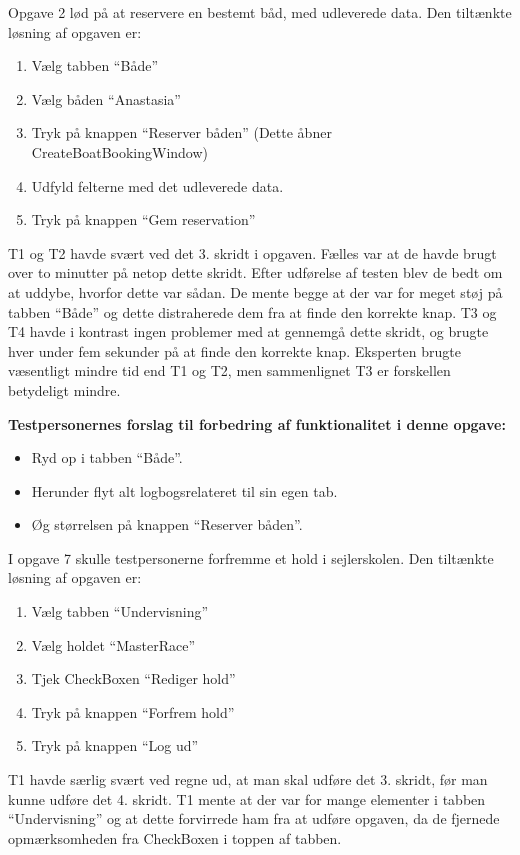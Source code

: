 Opgave 2 lød på at reservere en bestemt båd, med udleverede data.
Den tiltænkte løsning af opgaven er:
\begin{enumerate}
    \item Vælg tabben ``Både''
    \item Vælg båden ``Anastasia''
    \item Tryk på knappen ``Reserver båden'' (Dette åbner CreateBoatBookingWindow)
    \item Udfyld felterne med det udleverede data.
    \item Tryk på knappen ``Gem reservation''
\end{enumerate}

T1 og T2 havde svært ved det 3. skridt i opgaven.
Fælles var at de havde brugt over to minutter på netop dette skridt.
Efter udførelse af testen blev de bedt om at uddybe, hvorfor dette var sådan.
De mente begge at der var for meget støj på tabben ``Både'' og dette distraherede dem fra at finde den korrekte knap.
T3 og T4 havde i kontrast ingen problemer med at gennemgå dette skridt, og brugte hver under fem sekunder på at finde den korrekte knap. 
Eksperten brugte væsentligt mindre tid end T1 og T2, men sammenlignet T3 er forskellen betydeligt mindre.

\textbf{Testpersonernes forslag til forbedring af funktionalitet i denne opgave:}
\begin{itemize}
    \item Ryd op i tabben ``Både''. 
    \item Herunder flyt alt logbogsrelateret til sin egen tab.
    \item Øg størrelsen på knappen ``Reserver båden''.
\end{itemize}

I opgave 7 skulle testpersonerne forfremme et hold i sejlerskolen. 
Den tiltænkte løsning af opgaven er:
\begin{enumerate}
    \item Vælg tabben ``Undervisning''
    \item Vælg holdet ``MasterRace''
    \item Tjek CheckBoxen ``Rediger hold''
    \item Tryk på knappen ``Forfrem hold''
    \item Tryk på knappen ``Log ud''
\end{enumerate}

T1 havde særlig svært ved regne ud, at man skal udføre det 3. skridt, før man kunne udføre det 4. skridt.
T1 mente at der var for mange elementer i tabben ``Undervisning'' og at dette forvirrede ham fra at udføre opgaven, da de fjernede opmærksomheden fra CheckBoxen i toppen af tabben.

